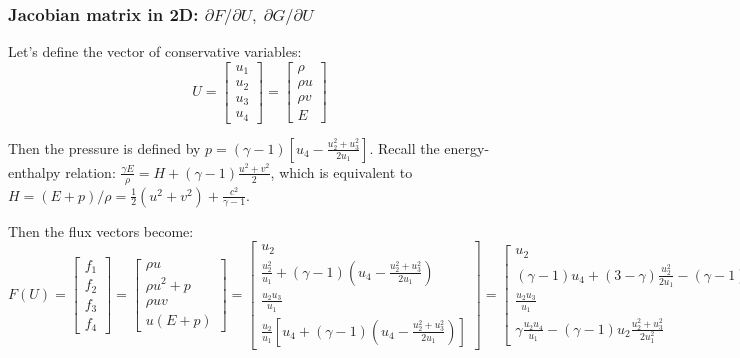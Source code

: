 \documentclass{article}
\begin{document}
\subsubsection*{Jacobian matrix in 2D: \boldmath $\partial F/\partial U, \; \partial G/\partial U$}

Let's define the vector of conservative variables:
\begin{equation}
  U = \left[
    \begin{array}{c}
      u_1\\
      u_2\\
      u_3\\
      u_4
    \end{array}
  \right] = \left[
    \begin{array}{c}
      \rho\\
      \rho u\\
      \rho v\\
      E
    \end{array}
  \right]
\end{equation}

Then the pressure is defined by $p=(\gamma-1)[u_4-\frac{u_2^2+u_3^2}{2u_1} ]$.
Recall the energy-enthalpy relation: $\frac{\gamma E}{\rho} = H+(\gamma-1)\frac{u^2+v^2}{2}$, which is equivalent to $H = (E+p)/\rho = \frac{1}{2}(u^2+v^2)+\frac{c^2}{\gamma-1}$.

Then the flux vectors become:
\begin{equation}
  F(U) = \left[
    \begin{array}{c}
      f_1 \\
      f_2 \\
      f_3 \\
      f_4
    \end{array}
  \right] = \left[
    \begin{array}{c}
      \rho u\\
      \rho u^2 + p\\
      \rho u v\\
      u(E+p)
    \end{array}
  \right] = \left[
    \begin{array}{c}
      u_2\\
      \frac{u_2^2}{u_1} + (\gamma-1) (u_4-\frac{u_2^2+u_3^2}{2u_1})\\
      \frac{u_2 u_3}{u_1}\\
      \frac{u_2}{u_1} [ u_4 + (\gamma-1)(u_4-\frac{u_2^2+u_3^2}{2u_1}) ]
    \end{array}
  \right] = \left[
    \begin{array}{c}
      u_2\\
      (\gamma-1)u_4 + (3-\gamma)\frac{u_2^2}{2u_1} - (\gamma-1)\frac{u_3^2}{2u_1}\\
      \frac{u_2 u_3}{u_1}\\
      \gamma \frac{u_2 u_4}{u_1} - (\gamma-1) u_2 \frac{u_2^2+u_3^2}{2 u_1^2}
    \end{array}
  \right]
\end{equation}
\end{document}
